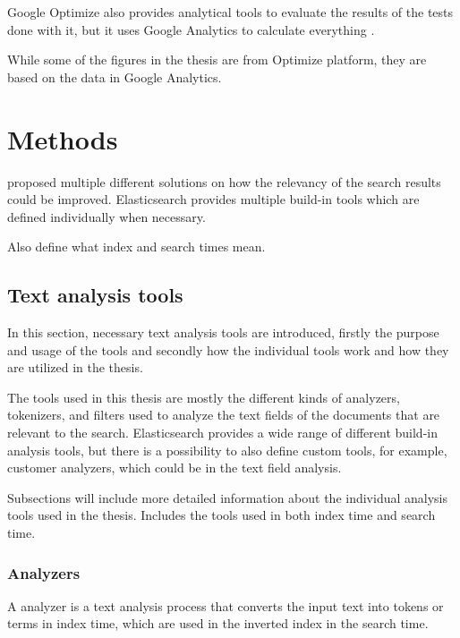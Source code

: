 Google Optimize also provides analytical tools to evaluate the results of the tests done with it, 
but it uses Google Analytics to calculate everything \cite{optimizeAbout}. 

\todo{}
While some of the figures in the thesis are from Optimize platform, they are based on the data in Google Analytics.




\chapter{Methods}
\label{ch:methods}

\citeauthor{relevantSearch} proposed multiple different solutions on how the relevancy of the search results could be improved.
Elasticsearch provides multiple build-in tools which are defined individually when necessary. \cite{relevantSearch}

\todo{} 
Also define what index and search times mean.

\section{Text analysis tools}
\label{sec:textAnalysisTools}
In this section, necessary text analysis tools are introduced, 
firstly the purpose and usage of the tools and secondly how the individual tools work and how they are utilized in the thesis.

The tools used in this thesis are mostly the different kinds of analyzers, tokenizers, and filters 
used to analyze the text fields of the documents that are relevant to the search. 
Elasticsearch provides a wide range of different build-in analysis tools, 
but there is a possibility to also define custom tools, for example, customer analyzers, 
which could be in the text field analysis. \cite{elasticIntro}

\todo{} 
Subsections will include more detailed information about the individual analysis tools used in the thesis.
Includes the tools used in both index time and search time.

\subsection{Analyzers}
A analyzer is a text analysis process that converts the input text into tokens or terms in index time, 
which are used in the inverted index in the search time. 
\cite{elasticIntro}

